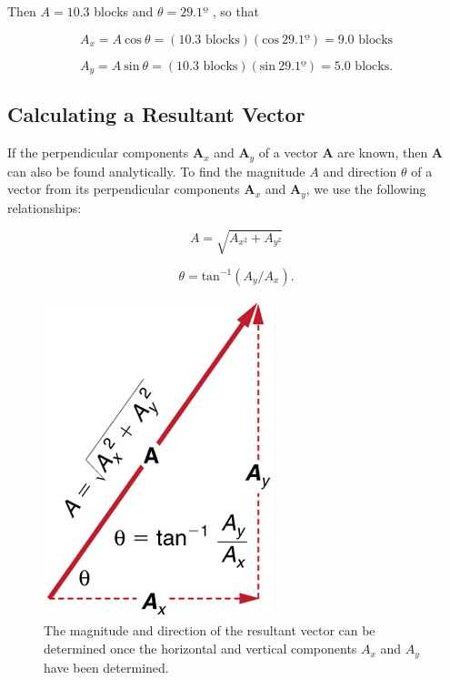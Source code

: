 \documentclass[
]{book}
\begin{document}
Then \({A = 10.3}{}\) blocks and \(\theta = 29.1º\) , so that

\leavevmode\hypertarget{eip-id1646569}{}%
\[A_{x} = A\ \text{cos}\ \theta = \left( \text{10.3\ blocks} \right)\left( \text{cos}\ 29.1º \right) = \text{9.0\ blocks}\]

\leavevmode\hypertarget{eip-id2495034}{}%
\[{A_{y} = A\ \text{sin}\ \theta = \left( \text{10.3\ blocks} \right)\left( \text{sin}\ 29.1º \right) = \text{5.0\ blocks}}\text{.}\]

\hypertarget{fs-id1344575}{}
\hypertarget{calculating-a-resultant-vector}{%
\subsection{Calculating a Resultant Vector}\label{calculating-a-resultant-vector}}

If the perpendicular components \(\mathbf{A}_{x}{}\) and
\(\mathbf{A}_{y}{}\) of a vector \(\mathbf{A}{}\) are known, then
\(\mathbf{A}{}\) can also be found analytically. To find the magnitude
\(A{}\) and direction \(\theta{}\) of a vector from its perpendicular
components \(\mathbf{A}_{x}{}\) and \(\mathbf{A}_{y}{}\), we use the
following relationships:

\leavevmode\hypertarget{eip-109}{}%
\[{A = \sqrt{A_{x^{2}} + A_{y^{2}}}}{}\]

\leavevmode\hypertarget{eip-750}{}%
\[{{\theta = \text{tan}^{- 1}}({A_{y}/A_{x}})}\text{.}{}\]

\begin{figure}
\hypertarget{import-auto-id1165298723894}{%
\centering
\includegraphics{images/Figure_03_03_04a.jpg}
\caption{The magnitude and direction of the resultant vector can be determined
once the horizontal and vertical components \(A_{x}{}\) and \(A_{y}{}\) have
been
determined.}\label{import-auto-id1165298723894}
}
\end{figure}
\end{document}

